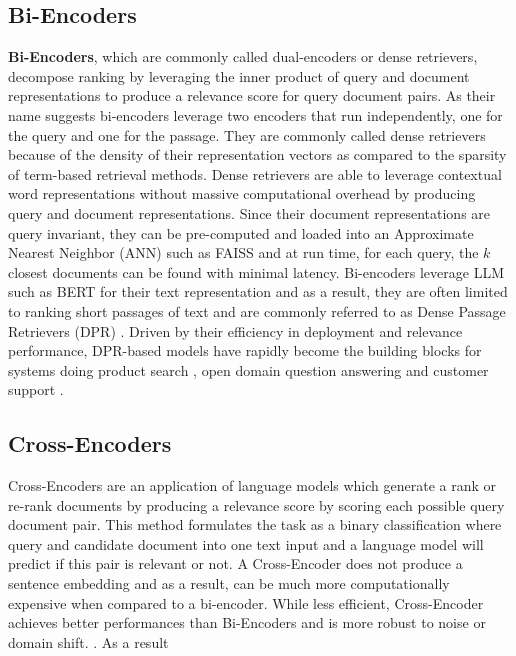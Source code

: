\subsection{Bi-Encoders}
\textbf{Bi-Encoders}, which are commonly called dual-encoders or dense retrievers, decompose ranking by leveraging the inner product of query and document representations to produce a relevance score for query document pairs. As their name suggests bi-encoders leverage two encoders that run independently, one for the query and one for the passage. They are commonly called dense retrievers because of the density of their representation vectors as compared to the sparsity of term-based retrieval methods. Dense retrievers are able to leverage contextual word representations without massive computational overhead by producing query and document representations. Since their document representations are query invariant, they can be pre-computed and loaded into an Approximate Nearest Neighbor (ANN) such as FAISS \cite{johnson2019billion} and at run time, for each query, the $k$ closest documents can be found with minimal latency. Bi-encoders leverage LLM such as BERT \cite{Devlin2019BERTPO} for their text representation and as a result, they are often limited to ranking short passages of text and are commonly referred to as Dense Passage Retrievers (DPR) \cite{Karpukhin2020DensePR} \cite{Reimers2019SentenceBERTSE}. Driven by their efficiency in deployment and relevance performance, DPR-based models have rapidly become the building blocks for systems doing product search \cite{Magnani2022SemanticRA}, open domain question answering \cite{Karpukhin2020DensePR} and customer support \cite{Mesquita2022DenseTR}. \\
\subsection{Cross-Encoders}
Cross-Encoders are an application of language models which generate a rank or re-rank documents by producing a relevance score by scoring each possible query document pair. This method formulates the task as a binary classification where query and candidate document into one text input and a language model will predict if this pair is relevant or not. A Cross-Encoder does not produce a sentence embedding and as a result, can be much more computationally expensive when compared to a bi-encoder. While less efficient, Cross-Encoder achieves better performances than Bi-Encoders and is more robust to noise or domain shift. \cite{Thakur2021BEIRAH}. As a result

